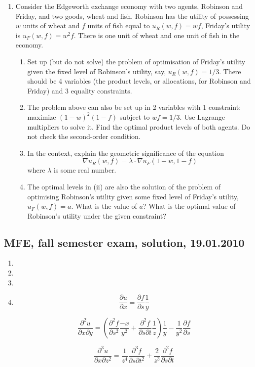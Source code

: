 \documentclass[12pt]{article} %
\theoremstyle{definition} %
\begin{document}
\begin{enumerate}[resume]
\item Consider the Edgeworth exchange economy with two agents, Robinson and Friday,
and two goods, wheat and fish. Robinson has the utility of possessing $w$ units of wheat
and $f$ units of fish equal to $u_R(w, f) = wf$, Friday’s utility is $u_F(w, f) = w^2 f$. There is one unit of wheat and one unit of fish in the economy.
\begin{enumerate}
\item Set up (but do not solve) the problem of optimisation of Friday’s utility given the
fixed level of Robinson’s utility, say, $u_R(w, f ) = 1/3$. There should be 4 variables (the product levels, or allocations, for Robinson and Friday) and 3 equality constraints.
\item The problem above can also be set up in 2 variables with 1 constraint: maximize
$(1-w)^2(1-f)$ subject to $wf = 1/3$. Use Lagrange multipliers to solve it. Find the optimal product levels of both agents. Do not check the second-order condition.
\item In the context, explain the geometric significance of the equation
\[
\nabla u_R (w, f ) = \lambda\cdot \nabla u_F (1 - w, 1 - f )
\]
where $\lambda$ is some real number.
\item The optimal levels in (ii) are also the solution of the problem of optimising Robinson’s utility given some fixed level of Friday’s utility, $u_F(w,f) = a$. What is the value of $a$? What is the optimal value of Robinson’s utility under the given constraint?
\end{enumerate}


\end{enumerate}


\subsection{MFE, fall semester exam, solution, 19.01.2010}

\begin{enumerate}
\item
\item
\item
\item
\[
\frac{\partial u}{\partial x} = \frac{\partial f}{\partial s} \frac{1}{y}
\]

\[
\frac{\partial^2 u}{\partial x\partial y} = \left(\frac{\partial^2 f}{\partial s^2} \frac{-x}{y^2}+ \frac{\partial^2 f}{\partial s\partial t}\frac{1}{z}\right)\frac{1}{y} - \frac{1}{y^2}  \frac{\partial f}{\partial s}
\]

\[
\frac{\partial^3 u}{\partial x\partial z^2} = \frac{1}{z^4} \frac{\partial^3 f}{\partial s\partial t^2} + \frac{2}{z^3} \frac{\partial^2 f}{\partial s\partial t}
\]

\end{enumerate}
\end{document}
